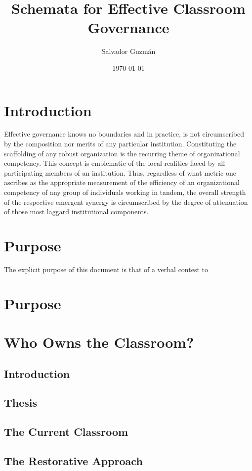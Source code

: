 \documentclass[12pt]{article}
\author{Salvador Guzm\'{a}n}
\date{\today}
\title{Schemata for Effective Classroom Governance}
\begin{document}
	\maketitle
	\pagebreak
	\tableofcontents
	\pagebreak
	
	\section{Introduction}
	Effective governance knows no boundaries and in practice, is not circumscribed by the composition nor merits of any particular institution. Constituting the scaffolding of any robust organization is the recurring theme of organizational competency. This concept is emblematic of the local realities faced by all participating members of an institution. Thus, regardless of what metric one ascribes as the appropriate measurement of the efficiency of an organizational competency of any group of individuals working in tandem, the overall strength of the respective emergent synergy is circumscribed by the degree of attenuation of those most laggard institutional components.
	
	\section{Purpose}
	The explicit purpose of this document is that of a verbal contest to 
	\section{Purpose}
	
	
	\section{Who Owns the Classroom?}
	\subsection{Introduction}
	\subsection{Thesis}
	\subsection{The Current Classroom}
	\subsection{The Restorative Approach}
\end{document}
